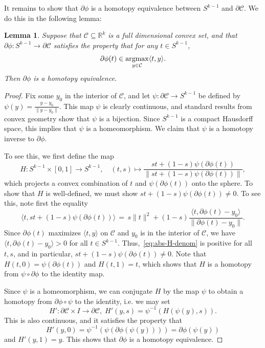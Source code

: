 \documentclass{article}
\numberwithin{equation}{section}
\newcommand{\R}{\mathbb{R}}
\newcommand{\argmax}{\operatornamewithlimits{argmax}}
\newtheorem{lemma}{Lemma}[section]
\newcommand{\cC}{\mathcal{C}}
\begin{document}
It remains to show that $\partial{\phi}$ is a homotopy equivalence between $S^{k-1}$ and $\partial \cC$. We do this in the following lemma:
\begin{lemma}
    Suppose that $\cC \subseteq \R^k$ is a full dimensional convex set, and that $\partial{\phi}: S^{k-1} \rightarrow \partial \cC$ satisfies the property that for any $t \in S^{k-1}$, 
    \[
    \partial{\phi}(t) \in \argmax_{y\in\cC} \langle t, y\rangle.
    \] 
    Then $\partial{\phi}$ is a homotopy equivalence.
\end{lemma}
\begin{proof}
    Fix some $y_0$ in the interior of $\cC$, and let $\psi : \partial \cC \rightarrow S^{k-1}$ be defined by $\psi(y) = \frac{y-y_0}{\|y-y_0\|}$. This map $\psi$ is clearly continuous, and standard results from convex geometry show that $\psi$ is a bijection. Since $S^{k-1}$ is a compact Hausdorff space, this implies that $\psi$ is a homeomorphism. We claim that $\psi$ is a homotopy inverse to $\partial {\phi}$.

    To see this, we first define the map 
    \[
        H: S^{k-1} \times [0,1] \rightarrow S^{k-1},
        \quad 
        (t,s) \mapsto \frac{s t + (1-s)\psi(\partial{\phi}(t))}{\|s t + (1-s)\psi(\partial{\phi}(t))\|},
    \]
   which projects a convex combination of $t$ and $\psi(\partial{\phi}(t))$ onto the sphere. 
    To show that $H$ is well-defined, we must show $s t + (1-s)\psi(\partial{\phi}(t)) \neq 0$. To see this, note first the equality
    \begin{equation}\label{eq:abs-H-denom}
        \langle t, s t + (1-s)\psi(\partial{\phi}(t)) \rangle  
        \,=\, 
        s \|t\|^2 + (1-s) \frac{\langle t, \partial\phi(t) - y_0\rangle}{\|\partial{\phi}(t) - y_0\|}.
    \end{equation}
    Since $\partial{\phi}(t)$ maximizes $\langle t, y\rangle$ on $\cC$ and $y_0$ is in the interior of $\cC$, we have $\langle t, \partial{\phi}(t) - y_0\rangle > 0$ for all $t \in S^{k-1}$. Thus,~\eqref{eq:abs-H-denom} is positive for all $t, s$, and in particular, $s t + (1-s)\psi(\partial{\phi}(t)) \neq 0$.
    Note that $H(t,0) = \psi(\partial{\phi}(t))$  and $H(t,1) = t$, which shows that $H$ is a homotopy from $\psi \circ \partial \phi$ to the identity map.

    Since $\psi$ is a homeomorphism, we can conjugate $H$ by the map $\psi$ to obtain a homotopy from $\partial{\phi} \circ \psi$ to the identity, i.e. we may set
    \[
        H': \partial \cC \times I \rightarrow  \partial \cC,\;H'(y,s) = \psi^{-1}(H(\psi(y), s)).
    \]
    This is also continuous, and it satisfies the property that 
    \[H'(y,0) = \psi^{-1}(\psi(\partial \phi(\psi(y)))) = \partial{\phi}(\psi(y))\] and $H'(y,1) = y$.
    This shows that $\partial{\phi}$ is a homotopy equivalence.
\end{proof}
\end{document}
